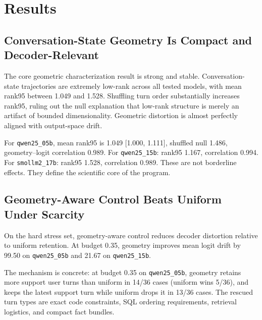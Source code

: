 \documentclass[conference]{IEEEtran}
\begin{document}
\section{Results}
\subsection{Conversation-State Geometry Is Compact and Decoder-Relevant}
The core geometric characterization result is strong and stable. Conversation-state trajectories are extremely low-rank across all tested models, with mean rank95 between 1.049 and 1.528. Shuffling turn order substantially increases rank95, ruling out the null explanation that low-rank structure is merely an artifact of bounded dimensionality. Geometric distortion is almost perfectly aligned with output-space drift.

\begin{table}[t]
    \centering
    \caption{Main geometry characterization results. Rank95 remains small, shuffled-turn nulls increase rank, and geometry--logit coupling remains extremely high.}
    \label{tab:paper1}
    \resizebox{\columnwidth}{!}{}
\end{table}

For \texttt{qwen25\_05b}, mean rank95 is 1.049 [1.000, 1.111], shuffled null 1.486, geometry--logit correlation 0.989. For \texttt{qwen25\_15b}: rank95 1.167, correlation 0.994. For \texttt{smollm2\_17b}: rank95 1.528, correlation 0.989. These are not borderline effects. They define the scientific core of the program.

\subsection{Geometry-Aware Control Beats Uniform Under Scarcity}
On the hard stress set, geometry-aware control reduces decoder distortion relative to uniform retention. At budget 0.35, geometry improves mean logit drift by 99.50 on \texttt{qwen25\_05b} and 21.67 on \texttt{qwen25\_15b}.

\begin{table}[t]
    \centering
    \caption{Geometry-vs-uniform results on the hard stress set. Negative deltas are improvements over uniform.}
    \label{tab:paper2}
    \resizebox{\columnwidth}{!}{}
\end{table}

The mechanism is concrete: at budget 0.35 on \texttt{qwen25\_05b}, geometry retains more support user turns than uniform in 14/36 cases (uniform wins 5/36), and keeps the latest support turn while uniform drops it in 13/36 cases. The rescued turn types are exact code constraints, SQL ordering requirements, retrieval logistics, and compact fact bundles.
\end{document}
